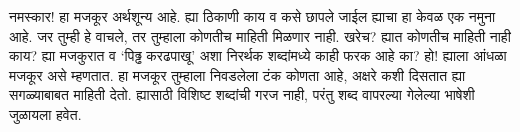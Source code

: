 नमस्कार! हा मजकूर अर्थशून्य आहे. ह्या ठिकाणी काय व कसे छापले जाईल ह्याचा हा केवळ एक नमुना
आहे. जर तुम्ही हे वाचले, तर तुम्हाला कोणतीच माहिती मिळणार नाही. खरेच? ह्यात कोणतीच माहिती
नाही काय? ह्या मजकुरात व `पिढ्ढ करढपाखू' अशा निरर्थक शब्दांमध्ये काही फरक आहे का? हो!
ह्याला आंधळा मजकूर असे म्हणतात. हा मजकूर तुम्हाला निवडलेला टंक कोणता आहे, अक्षरे कशी दिसतात
ह्या सगळ्याबाबत माहिती देतो. ह्यासाठी विशिष्ट शब्दांची गरज नाही, परंतु शब्द वापरल्या गेलेल्या
भाषेशी जुळायला हवेत. \par
